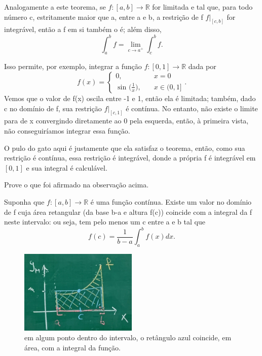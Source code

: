 \documentclass[../analysisII_notes.tex]{subfiles}
\begin{document}
\begin{tcolorbox}[
		skin=enhanced,
		title=Observação,
		fonttitle=\bfseries,
		colframe=black,
		colbacktitle=cyan!75!white,
		colback=cyan!15,
		colbacklower=black,
		coltitle=black,
		drop fuzzy shadow,
	]
	Analogamente a este teorema, se \(f:[a, b]\rightarrow \mathbb{R}\) for limitada e tal que, para todo número c, estritamente maior que a, entre a e b, a restrição de f \(f|_{[c, b]}\) for integrável, então a f em si também o é; além disso,
	\[
		\int_{a}^{b} f = \lim_{c\to a^{+}}\int_{c}^{b}f.
	\]

	Isso permite, por exemplo, integrar a função \(f:[0, 1]\rightarrow \mathbb{R}\) dada por
	\[
		f(x) = \left\{\begin{array}{ll}
			0,                                  & \quad x = 0       \\
			\sin^{}{\biggl(\frac{1}{x}\biggr)}, & \quad x\in (0, 1]
		\end{array}\right..
	\]
	Vemos que o valor de f(x) oscila entre -1 e 1, então ela é limitada; também, dado c no domínio de f, sua restrição \(f|_{[c, 1]}\) é contínua. No entanto, não existe o limite para de x convergindo diretamente ao 0 pela esquerda, então, à primeira vista, não conseguiríamos integrar essa função.

	O pulo do gato aqui é justamente que ela satisfaz o teorema, então, como sua restrição é contínua, essa restrição é integrável, donde a própria f é integrável em \([0, 1]\) e sua integral é calculável.
\end{tcolorbox}
\begin{exr}
	Prove o que foi afirmado na observação acima.
\end{exr}
\hypertarget{mean_value_theorem}{
	\begin{theorem*}
		Suponha que \(f:[a, b]\rightarrow \mathbb{R}\) é uma função contínua. Existe um valor no domínio de f cuja área retangular (da base b-a e altura f(c)) coincide com a integral da f neste intervalo: ou seja, tem pelo menos um c entre a e b tal que
		\[
			f(c) = \frac{1}{b-a}\int_{a}^{b}f(x)dx.
		\]
	\end{theorem*}
}
\begin{figure}[H]
	\begin{center}
		\includegraphics[height=0.5\textheight, width=0.5\textwidth, keepaspectratio]{./Images/mvt_integral_10.png}
	\end{center}
	\caption{em algum ponto dentro do intervalo, o retângulo azul coincide, em área, com a integral da função.}
	\label{mvt10}
\end{figure}
\end{document}
